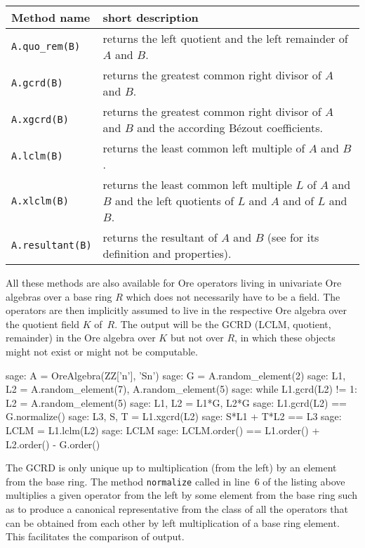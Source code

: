 \documentclass{llncs}
\begin{document}
\begin{center}
  \begin{tabular}{|l|p{.65\hsize}|}
    \hline
    Method name & short description \\\hline
    \verb|A.quo_rem(B)| & returns the left quotient and the left remainder of $A$ and $B$.\\
    \verb|A.gcrd(B)| & returns the greatest common right divisor of $A$ and $B$.\\
    \verb|A.xgcrd(B)| & returns the greatest common right divisor of $A$ and $B$ and the according B\'ezout coefficients.\\
    \verb|A.lclm(B)| & returns the least common left multiple of $A$ and $B$.\\
    \verb|A.xlclm(B)| & returns the least common left multiple $L$ of $A$ and $B$ and the left quotients of $L$ and $A$ and of $L$ and $B$.\\
    \verb|A.resultant(B)| & returns the resultant of $A$ and $B$ (see \cite{li96} for its definition and
    properties).\\
    \hline
  \end{tabular}
\end{center}

All these methods are also available for Ore operators living in univariate Ore
algebras over a base ring $R$ which does not necessarily have to be a
field. The operators are then implicitly assumed to live in the respective Ore
algebra over the quotient field $K$ of~$R$. The output will be the
GCRD (LCLM, quotient, remainder) in the Ore algebra over $K$ but not over
$R$, in which these objects might not exist or might not be computable.

\begin{sageexample}
  sage: A = OreAlgebra(ZZ['n'], 'Sn')
  sage: G = A.random_element(2)
  sage: L1, L2 = A.random_element(7), A.random_element(5)
  sage: while L1.gcrd(L2) != 1: L2 = A.random_element(5)                       
  sage: L1, L2 = L1*G, L2*G                                                        
  sage: L1.gcrd(L2) == G.normalize()
  sage: L3, S, T = L1.xgcrd(L2)                             
  sage: S*L1 + T*L2 == L3
  sage: LCLM = L1.lclm(L2)
  sage: LCLM %
  sage: LCLM.order() == L1.order() + L2.order() - G.order()
\end{sageexample}

The GCRD is only unique up to multiplication (from the left) by an element from
the base ring. The method \verb|normalize| called in line~6 of the listing above
multiplies a given operator from the left by some element from the base ring
such as to produce a canonical representative from the class of all the operators
that can be obtained from each other by left multiplication of a base ring
element. This facilitates the comparison of output.
\end{document}
